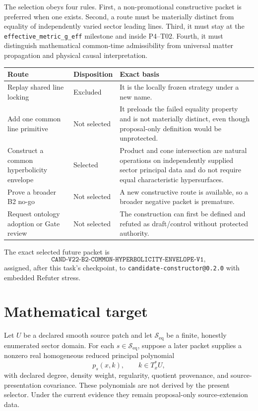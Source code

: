\documentclass[11pt]{article}
\newcommand{\Seq}{\mathcal S_{\mathrm{eq}}}
\begin{document}
The selection obeys four rules.  First, a non-promotional constructive packet
is preferred when one exists.  Second, a route must be materially distinct
from equality of independently varied sector leading lines.  Third, it must
stay at the \texttt{effective\_metric\_g\_eff} milestone and inside P4--T02.
Fourth, it must distinguish mathematical common-time admissibility from
universal matter propagation and physical causal interpretation.

\begin{longtable}{>{\raggedright\arraybackslash}p{}>{\raggedright\arraybackslash}p{}>{\raggedright\arraybackslash}p{}}
\toprule
Route & Disposition & Exact basis\\
\midrule
Replay shared line locking & Excluded & It is the locally frozen strategy under a new name.\\
Add one common line primitive & Not selected & It preloads the failed equality property and is not materially distinct, even though proposal-only definition would be unprotected.\\
Construct a common hyperbolicity envelope & Selected & Product and cone intersection are natural operations on independently supplied sector principal data and do not require equal characteristic hypersurfaces.\\
Prove a broader B2 no-go & Not selected & A new constructive route is available, so a broader negative packet is premature.\\
Request ontology adoption or Gate review & Not selected & The construction can first be defined and refuted as draft/control without protected authority.\\
\bottomrule
\end{longtable}

The exact selected future packet is
\[
 \texttt{CAND-V22-B2-COMMON-HYPERBOLICITY-ENVELOPE-V1},
\]
assigned, after this task's checkpoint, to
\texttt{candidate-constructor@0.2.0} with embedded Refuter stress.

\section{Mathematical target}

Let \(U\) be a declared smooth source patch and let \(\Seq\) be a finite,
honestly enumerated sector domain.  For each \(s\in\Seq\), suppose a later
packet supplies a nonzero real homogeneous reduced principal polynomial
\[
 p_s(x,k),\qquad k\in T_x^*U,
\]
with declared degree, density weight, regularity, quotient provenance, and
source-presentation covariance.  These polynomials are not derived by the
present selector.  Under the current evidence they remain proposal-only
source-extension data.
\end{document}
